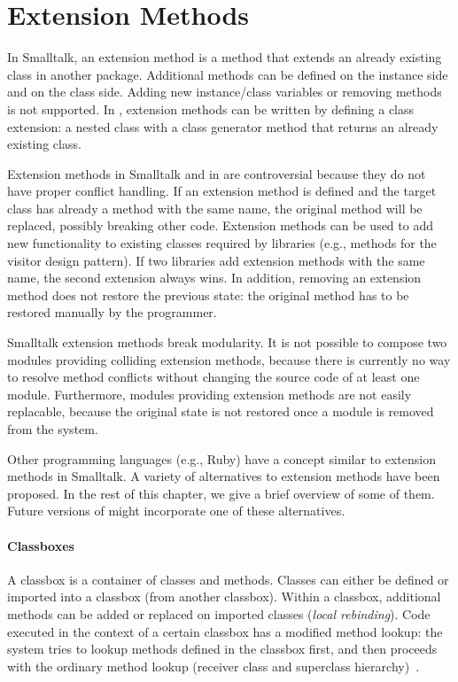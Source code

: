 \section{Extension Methods}
\label{sec:future_ext_meth}
In Smalltalk, an extension method is a method that extends an already existing class in another package. Additional methods can be defined on the instance side and on the class side. Adding new instance/class variables or removing methods is not supported. In \msname, extension methods can be written by defining a class extension: a nested class with a class generator method that returns an already existing class.

Extension methods in Smalltalk and in \msname are controversial because they do not have proper conflict handling. If an extension method is defined and the target class has already a method with the same name, the original method will be replaced, possibly breaking other code. Extension methods can be used to add new functionality to existing classes required by libraries (e.g., methods for the visitor design pattern). If two libraries add extension methods with the same name, the second extension always wins. In addition, removing an extension method does not restore the previous state: the original method has to be restored manually by the programmer.

Smalltalk extension methods break modularity. It is not possible to compose two modules providing colliding extension methods, because there is currently no way to resolve method conflicts without changing the source code of at least one module. Furthermore, modules providing extension methods are not easily replacable, because the original state is not restored once a module is removed from the system.

Other programming languages (e.g., Ruby) have a concept similar to extension methods in Smalltalk. A variety of alternatives to extension methods have been proposed. In the rest of this chapter, we give a brief overview of some of them. Future versions of \msname might incorporate one of these alternatives.

\paragraph{Classboxes}
A classbox is a container of classes and methods. Classes can either be defined or imported into a classbox (from another classbox). Within a classbox, additional methods can be added or replaced on imported classes (\emph{local rebinding}). Code executed in the context of a certain classbox has a modified method lookup: the system tries to lookup methods defined in the classbox first, and then proceeds with the ordinary method lookup (receiver class and superclass hierarchy)~\cite{bergel:inria-00533446}.

